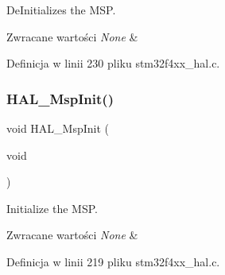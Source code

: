 De\+Initializes the M\+SP. 


\begin{DoxyRetVals}{Zwracane wartości}
{\em None} & \\
\hline
\end{DoxyRetVals}


Definicja w linii 230 pliku stm32f4xx\+\_\+hal.\+c.

\mbox{\label{group___h_a_l___exported___functions___group1_gae4fb8e66865c87d0ebab74a726a6891f}} 
\subsubsection{\texorpdfstring{H\+A\+L\+\_\+\+Msp\+Init()}{HAL\_MspInit()}}
{\footnotesize\ttfamily void H\+A\+L\+\_\+\+Msp\+Init (\begin{DoxyParamCaption}\item[{void}]{ }\end{DoxyParamCaption})}



Initialize the M\+SP. 


\begin{DoxyRetVals}{Zwracane wartości}
{\em None} & \\
\hline
\end{DoxyRetVals}


Definicja w linii 219 pliku stm32f4xx\+\_\+hal.\+c.

